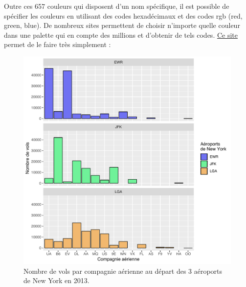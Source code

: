 \documentclass[a4paperpaper,]{article}
\newenvironment{Shaded}{\begin{snugshade}}{\end{snugshade}}
\newcommand{\CharTok}[1]{\textcolor[rgb]{0.57,0.30,0.62}{#1}}
\newcommand{\DataTypeTok}[1]{\textcolor[rgb]{0.00,0.34,0.68}{#1}}
\newcommand{\DecValTok}[1]{\textcolor[rgb]{0.69,0.50,0.00}{#1}}
\newcommand{\KeywordTok}[1]{\textcolor[rgb]{0.12,0.11,0.11}{\textbf{#1}}}
\newcommand{\NormalTok}[1]{\textcolor[rgb]{0.12,0.11,0.11}{#1}}
\newcommand{\OperatorTok}[1]{\textcolor[rgb]{0.12,0.11,0.11}{#1}}
\newcommand{\StringTok}[1]{\textcolor[rgb]{0.75,0.01,0.01}{#1}}
\begin{document}
Outre ces 657 couleurs qui disposent d'un nom spécifique, il est possible de spécifier les couleurs en utilisant des codes hexadécimaux et des codes rgb (red, green, blue). De nombreux sites permettent de choisir n'importe quelle couleur dans une palette qui en compte des millions et d'obtenir de tels codes. \href{https://www.color-hex.com}{Ce site} permet de le faire très simplement :

\begin{Shaded}
\end{Shaded}

\begin{figure}[htpb]

{\centering \includegraphics[width=0.9\linewidth]{figure/barfacethex-1} 

}

\caption{Nombre de vols par compagnie aérienne au départ des 3 aéroports de New York en 2013.}\label{fig:barfacethex}
\end{figure}
\end{document}
